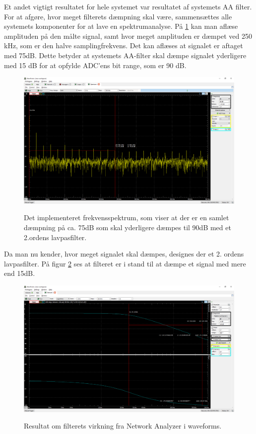 \pagebreak 

Et andet vigtigt resultatet for hele systemet var resultatet af systemets AA filter. For at afgøre, hvor meget filterets dæmpning skal være, sammensættes alle systemets komponenter for at lave en spektrumanalyse. På \ref{fig:aaspectrum1} kan man aflæse amplituden på den målte signal, samt hvor meget amplituden er dæmpet ved 250 kHz, som er den halve samplingfrekvens. Det kan aflæses at signalet er aftaget med 75dB. Dette betyder at systemets AA-filter skal dæmpe signalet yderligere med 15 dB  for at opfylde ADC'ens bit range, som er 90 dB.   

       
\begin{figure}[H] 
\centering
{\includegraphics[width=\linewidth]
{Figure/aaspectrum1}}
\caption{Det implementeret frekvensspektrum, som viser at der er en samlet dæmpning på ca. 75dB som skal yderligere dæmpes til 90dB med et 2.ordens lavpasfilter.}
\label{fig:aaspectrum1}
\end{figure}

\pagebreak

Da man nu kender, hvor meget signalet skal dæmpes, designes der et 2. ordens lavpasfilter. På figur \ref{fig:aafiltermodultest} ses at filteret er i stand til at dæmpe et signal med mere end 15dB. 


\begin{figure}[H] 
\centering
{\includegraphics[width=\linewidth]
{Figure/aafiltermodultest}}
\caption{Resultat om filterets virkning fra Network Analyzer i waveforms.}
\label{fig:aafiltermodultest}
\end{figure}




